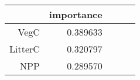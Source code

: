 \begin{tabular}{rrrrr}
\toprule
 & importance \\
\midrule
VegC & 0.389633 \\
LitterC & 0.320797 \\
NPP & 0.289570 \\
\bottomrule
\end{tabular}
